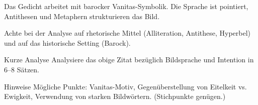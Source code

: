 \documentclass[11pt,a4paper,oneside]{article}
\begin{document}
	\begin{interpret}
		Das Gedicht arbeitet mit barocker Vanitas-Symbolik. Die Sprache ist pointiert, Antithesen und Metaphern strukturieren das Bild.
	\end{interpret}
	
	\begin{hinweis}
		Achte bei der Analyse auf rhetorische Mittel (Alliteration, Antithese, Hyperbel) und auf das historische Setting (Barock).
	\end{hinweis}
	
	\begin{aufgabe}{Kurze Analyse}
		Analysiere das obige Zitat bezüglich Bildsprache und Intention in 6–8 Sätzen.
	\end{aufgabe}
	
	\begin{loesung}{Hinweise}
		Mögliche Punkte: Vanitas-Motiv, Gegenüberstellung von Eitelkeit vs. Ewigkeit, Verwendung von starken Bildwörtern. (Stichpunkte genügen.)
	\end{loesung}
	
\end{document}
